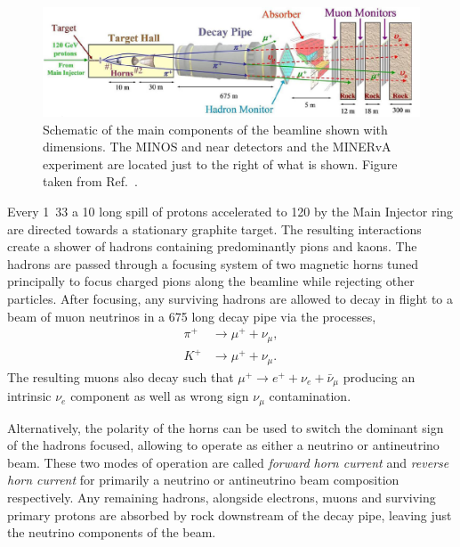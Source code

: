 \begin{figure} %
    \includegraphics[width=\textwidth]{diagrams/4-chips/numi_beam.png}
    \caption[Schematic of the main components of the \numi beam]
    {Schematic of the main components of the \numi beamline shown with dimensions. The MINOS and
        \nova near detectors and the MINERvA experiment are located just to the right of what is
        shown. Figure taken from Ref.~\cite{adamson2016}.}
    \label{fig:numi_beam}
\end{figure}

Every \unit{1.33}{} a \unit{10}{\mu{}} long spill of protons accelerated
to \unit{120}{\GeV} by the Main Injector ring are directed towards a stationary graphite target.
The resulting interactions create a shower of hadrons containing predominantly pions and kaons.
The hadrons are passed through a focusing system of two magnetic horns tuned principally to focus
charged pions along the beamline while rejecting other particles. After focusing, any surviving
hadrons are allowed to decay in flight to a beam of muon neutrinos in a \unit{675}{}
long decay pipe via the processes,
\begin{align} %
    \pi^{+} & \rightarrow\mu^{+}+\nu_{\mu}, \label{eq:pi_decays}   \\
    K^{+}   & \rightarrow\mu^{+}+\nu_{\mu}. \label{eq:kaon_decays}
\end{align}
The resulting muons also decay such that $\mu^{+}\rightarrow e^{+}+\nu_{e}+\bar{\nu}_{\mu}$
producing an intrinsic $\nu_{e}$ component as well as wrong sign $\nu_{\mu}$ contamination.

Alternatively, the polarity of the horns can be used to switch the dominant sign of the hadrons
focused, allowing \numi to operate as either a neutrino or antineutrino beam. These two modes of
operation are called \emph{forward horn current} and \emph{reverse horn current} for primarily a
neutrino or antineutrino beam composition respectively. Any remaining hadrons, alongside
electrons, muons and surviving primary protons are absorbed by rock downstream of the decay pipe,
leaving just the neutrino components of the beam.

